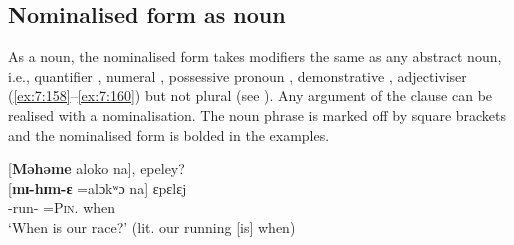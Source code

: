 \begin{table}
\caption{Nominalised form tone patterns\label{tab:68}}
\end{table}

\subsection{Nominalised form as noun}\label{sec:7.6.1}
\hypertarget{RefHeading1212421525720847}{}
As a noun, the nominalised form takes modifiers the same as any abstract noun, i.e., quantifier  , numeral , possessive pronoun , demonstrative , adjectiviser (\ref{ex:7:158}--\ref{ex:7:160}) but not plural (see ). Any argument of the clause can be realised with a nominalisation. The noun phrase is marked off by square brackets and the nominalised form is bolded in the examples. 

\ea\label{ex:7:154}
{}[\textbf{Məhəme} aloko   na],  epeley?~\\
\gll  {}[\textbf{mɪ-hɪm-ɛ}    =alɔkʷɔ    na]  ɛpɛlɛj~\\
      {\NOM}{}-run-{\CL}  =\textsc{Pin}.{\POSS}  {\PSP}  when\\
\glt  ‘When is our race?’ (lit. our running [is] when)\\
\z 

